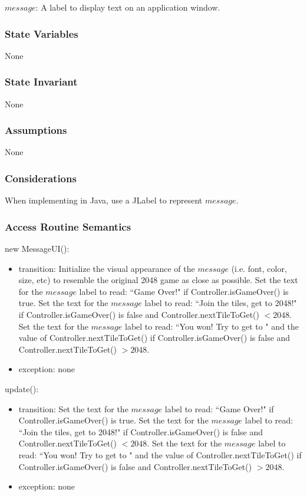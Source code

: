 \documentclass[12pt]{article}
\begin{document}
$message$: A label to display text on an application window.

\subsubsection* {State Variables}

None

\subsubsection* {State Invariant}

None

\subsubsection* {Assumptions}

None

\subsubsection* {Considerations}

When implementing in Java, use a JLabel to represent $message$.

\newpage

\subsubsection* {Access Routine Semantics}

\noindent new MessageUI():
\begin{itemize}
\item transition: Initialize the visual appearance of the $message$ (i.e. font, color, size, etc) to resemble the original 2048 game as close as possible. Set the text for the $message$ label to read: ``Game Over!" if Controller.isGameOver() is true. Set the text for the $message$ label to read: ``Join the tiles, get to 2048!" if Controller.isGameOver() is false and Controller.nextTileToGet() $< 2048$. Set the text for the $message$ label to read: ``You won! Try to get to " and the value of Controller.nextTileToGet() if Controller.isGameOver() is false and Controller.nextTileToGet() $> 2048$.
\item exception: none
\end{itemize}

\noindent update():
\begin{itemize}
\item transition: Set the text for the $message$ label to read: ``Game Over!" if Controller.isGameOver() is true. Set the text for the $message$ label to read: ``Join the tiles, get to 2048!" if Controller.isGameOver() is false and Controller.nextTileToGet() $< 2048$. Set the text for the $message$ label to read: ``You won! Try to get to " and the value of Controller.nextTileToGet() if Controller.isGameOver() is false and Controller.nextTileToGet() $> 2048$.
\item exception: none
\end{itemize}
\end{document}
